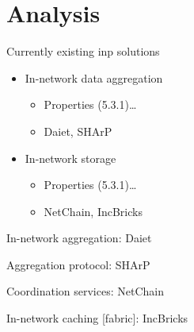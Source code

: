 \section{Analysis}

\begin{frame}{Currently existing \gls{inp} solutions}
	\begin{itemize}
		\item In-network data aggregation
    \begin{itemize}
      \item Properties (5.3.1)…
      \item Daiet, SHArP
    \end{itemize}
		\item In-network storage
    \begin{itemize}
      \item Properties (5.3.1)…
      \item NetChain, IncBricks
    \end{itemize}
	\end{itemize}
\end{frame}
\begin{frame}{In-network aggregation: Daiet}
\end{frame}
\begin{frame}{Aggregation protocol: SHArP}
\end{frame}
\begin{frame}{Coordination services: NetChain}
\end{frame}
\begin{frame}{In-network caching [fabric]: IncBricks}
\end{frame}
